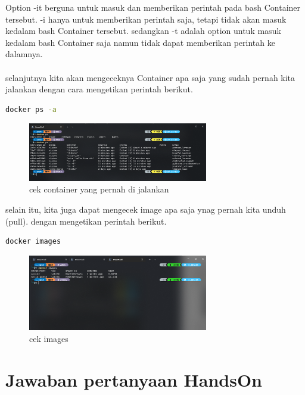 \documentclass[11pt,a4paper]{article}
\begin{document}
Option -it berguna untuk masuk dan memberikan perintah pada bash Container tersebut. -i hanya untuk memberikan perintah saja, tetapi tidak akan masuk kedalam bash Container tersebut.
sedangkan -t adalah option untuk masuk kedalam bash Container saja namun tidak dapat memberikan perintah ke dalamnya.\\\\

selanjutnya kita akan mengeceknya Container apa saja yang sudah pernah kita jalankan dengan cara mengetikan perintah berikut.
\begin{lstlisting}[language = bash]
	docker ps -a
\end{lstlisting}
\begin{figure}[h]
	\centering
	\includegraphics[width = 0.7\textwidth]{Figure/asset/docker ps.png}
	\caption{cek container yang pernah di jalankan}
\end{figure}

selain itu, kita juga dapat mengecek image apa saja ynag pernah kita unduh (pull). dengan mengetikan perintah berikut.
\begin{lstlisting}[language = bash]
	docker images
\end{lstlisting}
\begin{figure}[h]
	\centering
	\includegraphics[width = 0.7\textwidth]{Figure/asset/docker_images.png}
	\caption{cek images}
\end{figure}

\section{Jawaban pertanyaan HandsOn}
\end{document}
